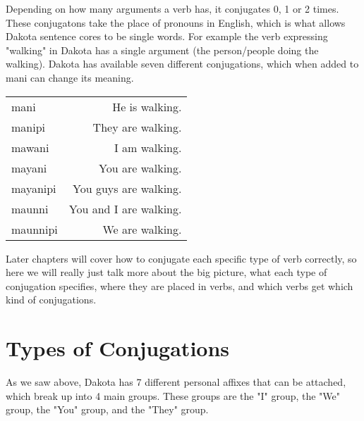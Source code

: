 \documentclass[10pt,a4paper]{article} %
\begin{document}
    \title{\rmfamily\normalfont{}}
    \date{} %
    \maketitle
    

Depending on how many arguments a verb has, it conjugates 0, 1 or 2 times.  These conjugatons take the place of pronouns in English, which is what allows Dakota sentence cores to be single words.  For example the verb expressing "walking" in Dakota has a single argument (the person/people doing the walking).  Dakota has available seven different conjugations, which when added to mani can change its meaning.

\begin{center}
\begin{tabular}{ l r }
  mani & He is walking. \\
  manipi & They are walking.\\
  mawani & I am walking. \\
  mayani & You are walking. \\
  mayanipi & You guys are walking.\\
  maunni & You and I are walking. \\
  maunnipi & We are walking. \\
\end{tabular}
\end{center}

Later chapters will cover how to conjugate each specific type of verb correctly, so here we will really just talk more about the big picture, what each type of conjugation specifies, where they are placed in verbs, and which verbs get which kind of conjugations.



     \section{Types of Conjugations}

As we saw above, Dakota has 7 different personal affixes that can be attached, which break up into 4 main groups. These groups are the "I" group, the "We" group, the "You" group, and the "They" group.  

\end{document}
